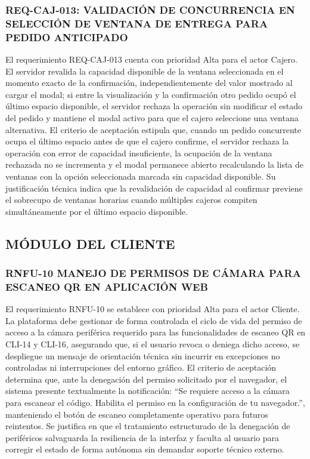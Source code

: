 \subsubsection{REQ-CAJ-013: VALIDACIÓN DE CONCURRENCIA EN SELECCIÓN DE VENTANA DE ENTREGA PARA PEDIDO ANTICIPADO}
El requerimiento REQ-CAJ-013 cuenta con prioridad Alta para el actor Cajero. El servidor revalida la capacidad disponible de la ventana seleccionada en el momento exacto de la confirmación, independientemente del valor mostrado al cargar el modal; si entre la visualización y la confirmación otro pedido ocupó el último espacio disponible, el servidor rechaza la operación sin modificar el estado del pedido y mantiene el modal activo para que el cajero seleccione una ventana alternativa. El criterio de aceptación estipula que, cuando un pedido concurrente ocupa el último espacio antes de que el cajero confirme, el servidor rechaza la operación con error de capacidad insuficiente, la ocupación de la ventana rechazada no se incrementa y el modal permanece abierto recalculando la lista de ventanas con la opción seleccionada marcada sin capacidad disponible. Su justificación técnica indica que la revalidación de capacidad al confirmar previene el sobrecupo de ventanas horarias cuando múltiples cajeros compiten simultáneamente por el último espacio disponible.

\subsection{MÓDULO DEL CLIENTE}

\subsubsection{RNFU-10 MANEJO DE PERMISOS DE CÁMARA PARA ESCANEO QR EN APLICACIÓN WEB}
El requerimiento RNFU-10 se establece con prioridad Alta para el actor Cliente. La plataforma debe gestionar de forma controlada el ciclo de vida del permiso de acceso a la cámara periférica requerido para las funcionalidades de escaneo QR en CLI-14 y CLI-16, asegurando que, si el usuario revoca o deniega dicho acceso, se despliegue un mensaje de orientación técnica sin incurrir en excepciones no controladas ni interrupciones del entorno gráfico. El criterio de aceptación determina que, ante la denegación del permiso solicitado por el navegador, el sistema presente textualmente la notificación: ``Se requiere acceso a la cámara para escanear el código. Habilita el permiso en la configuración de tu navegador.'', manteniendo el botón de escaneo completamente operativo para futuros reintentos. Se justifica en que el tratamiento estructurado de la denegación de periféricos salvaguarda la resiliencia de la interfaz y faculta al usuario para corregir el estado de forma autónoma sin demandar soporte técnico externo.

